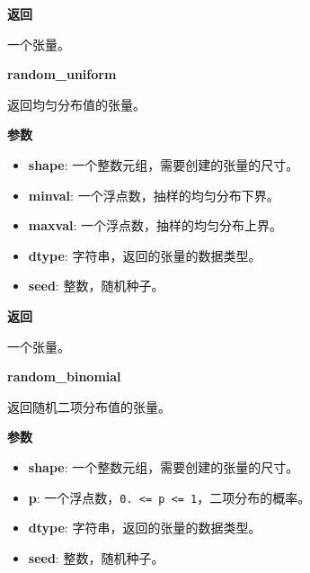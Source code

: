 \textbf{返回}

一个张量。


\textbf{random\_uniform}\label{randomux5funiform}

\begin{Shaded}
\begin{Highlighting}[]
\OperatorTok{=}\OperatorTok{=}\OperatorTok{=}\OperatorTok{=}\NormalTok{)}
\end{Highlighting}
\end{Shaded}

返回均匀分布值的张量。

\textbf{参数}

\begin{itemize}
\tightlist
\item
  \textbf{shape}: 一个整数元组，需要创建的张量的尺寸。
\item
  \textbf{minval}: 一个浮点数，抽样的均匀分布下界。
\item
  \textbf{maxval}: 一个浮点数，抽样的均匀分布上界。
\item
  \textbf{dtype}: 字符串，返回的张量的数据类型。
\item
  \textbf{seed}: 整数，随机种子。
\end{itemize}

\textbf{返回}

一个张量。


\textbf{random\_binomial}\label{randomux5fbinomial}

\begin{Shaded}
\begin{Highlighting}[]
\OperatorTok{=}\OperatorTok{=}\OperatorTok{=}\NormalTok{)}
\end{Highlighting}
\end{Shaded}

返回随机二项分布值的张量。

\textbf{参数}

\begin{itemize}
\tightlist
\item
  \textbf{shape}: 一个整数元组，需要创建的张量的尺寸。
\item
  \textbf{p}:
  一个浮点数，\texttt{0.\ \textless{}=\ p\ \textless{}=\ 1}，二项分布的概率。
\item
  \textbf{dtype}: 字符串，返回的张量的数据类型。
\item
  \textbf{seed}: 整数，随机种子。
\end{itemize}

